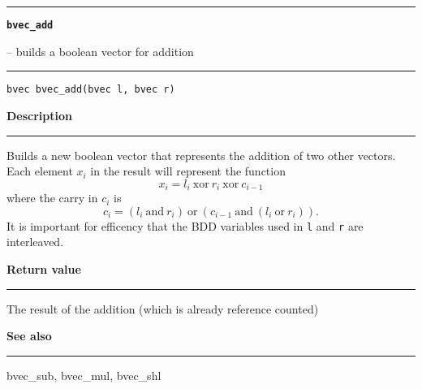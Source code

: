 \vspace{8ex}
\begin{minipage}{\textwidth}

\noindent\begin{minipage}{\textwidth}
\rule{\textwidth}{0.5mm}
{\tt\bf bvec\_add }
\--- builds a boolean vector for addition  \hspace{\fill}
\\\rule[1.5ex]{\textwidth}{0.5mm}
\end{minipage}

\noindent\begin{verbatim}
bvec bvec_add(bvec l, bvec r) 
\end{verbatim}

\vspace{\parsep}\noindent
{\bf Description}\\\rule[1.5ex]{\textwidth}{0.2mm}\vspace{-1.5ex}\setlength{\parindent}{1em}
Builds a new boolean vector that represents the addition of two
           other vectors. Each element $x_i$ in the result will represent
	   the function
	   \[ x_i = l_i\ \mbox{xor}\ r_i\ \mbox{xor}\ c_{i-1} \]
	   where the carry in $c_i$ is
	   \[ c_i = (l_i\ \mbox{and}\ r_i)\ \mbox{or}\ (c_{i-1}\ \mbox{and}
	            \ (l_i\ \mbox{or}\ r_i)). \]
	   It is important for efficency that the BDD
	   variables used in {\tt l} and {\tt r} are interleaved. 

\setlength{\parindent}{0em}\vspace{\parsep}\vspace{\baselineskip}\noindent
{\bf Return value}\\\rule[1.5ex]{\textwidth}{0.2mm}\vspace{-1.5ex}
The result of the addition (which is already reference counted) 

\vspace{\parsep}\vspace{\baselineskip}\noindent
{\bf See also}\\\rule[1.5ex]{\textwidth}{0.2mm}\vspace{-1.5ex}
bvec\_sub, bvec\_mul, bvec\_shl 
\end{minipage}
\vspace{8ex}
